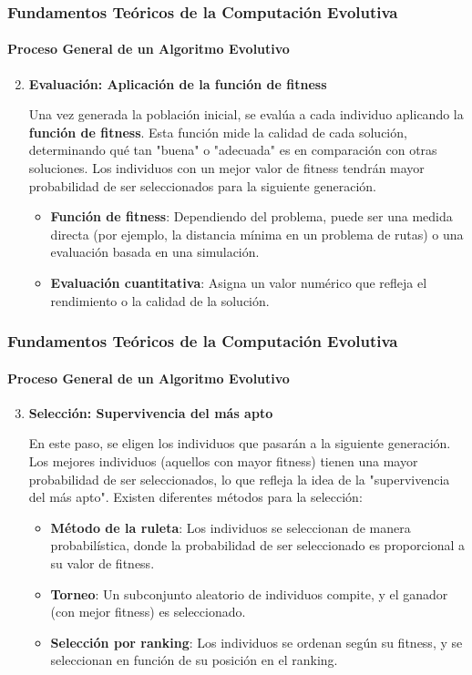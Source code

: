 \documentclass[
	11pt, %
]{beamer}
\begin{document}
\begin{frame}
    \frametitle{Fundamentos Teóricos de la Computación Evolutiva}
    \framesubtitle{Proceso General de un Algoritmo Evolutivo}
    \begin{enumerate}
    \setcounter{enumi}{1}
        \item \textbf{Evaluación: Aplicación de la función de fitness}
        
        Una vez generada la población inicial, se evalúa a cada individuo aplicando la \textbf{función de fitness}. Esta función mide la calidad de cada solución, determinando qué tan "buena" o "adecuada" es en comparación con otras soluciones. Los individuos con un mejor valor de fitness tendrán mayor probabilidad de ser seleccionados para la siguiente generación.
        
        \begin{itemize}
            \item \textbf{Función de fitness}: Dependiendo del problema, puede ser una medida directa (por ejemplo, la distancia mínima en un problema de rutas) o una evaluación basada en una simulación.
            \item \textbf{Evaluación cuantitativa}: Asigna un valor numérico que refleja el rendimiento o la calidad de la solución.
        \end{itemize}
    \end{enumerate}
\end{frame}

\begin{frame}
    \frametitle{Fundamentos Teóricos de la Computación Evolutiva}
    \framesubtitle{Proceso General de un Algoritmo Evolutivo}
    \begin{enumerate}
    \setcounter{enumi}{2}
        \item \textbf{Selección: Supervivencia del más apto}
        
        En este paso, se eligen los individuos que pasarán a la siguiente generación. Los mejores individuos (aquellos con mayor fitness) tienen una mayor probabilidad de ser seleccionados, lo que refleja la idea de la "supervivencia del más apto". Existen diferentes métodos para la selección:
        
        \begin{itemize}
            \item \textbf{Método de la ruleta}: Los individuos se seleccionan de manera probabilística, donde la probabilidad de ser seleccionado es proporcional a su valor de fitness.
            \item \textbf{Torneo}: Un subconjunto aleatorio de individuos compite, y el ganador (con mejor fitness) es seleccionado.
            \item \textbf{Selección por ranking}: Los individuos se ordenan según su fitness, y se seleccionan en función de su posición en el ranking.
        \end{itemize}
    \end{enumerate}
\end{frame}
\end{document}
